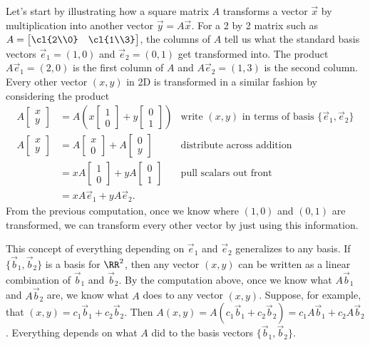 Let's start by illustrating how a square matrix $A$ transforms a
vector $\vec x$ by multiplication into another vector $\vec y=A\vec
x$.  For a 2 by 2 matrix such as $A
= \begin{bmatrix}\cl{2\\0}&\cl{1\\3}\end{bmatrix}$, the columns of $A$
tell us what the standard basis vectors $\vec e_1 = (1,0)$ and $\vec
e_2=(0,1)$ get transformed into.  The
product $A\vec e_1 = (2,0)$ is the first column of $A$ and $A \vec e_2
= (1,3)$ is the second column.  Every other vector $(x,y)$ in 2D is
transformed in a similar fashion by considering the product
\begin{align*}
A\begin{bmatrix}x\\y\end{bmatrix} 
&=A\left(x\begin{bmatrix}1\\0\end{bmatrix}+ 
y\begin{bmatrix}0\\1\end{bmatrix}\right) &\text{write $(x,y)$ in terms of
basis $\{\vec e_1, \vec e_2\}$}\\
A\begin{bmatrix}x\\y\end{bmatrix} 
&=A\begin{bmatrix}x\\0\end{bmatrix}+ 
A\begin{bmatrix}0\\y\end{bmatrix} &\text{distribute across addition}\\
&=xA\begin{bmatrix}1\\0\end{bmatrix}+ 
yA\begin{bmatrix}0\\1\end{bmatrix} &\text{pull scalars out front}\\
&=xA\vec e_1+yA\vec e_2.
\end{align*}
From the previous computation, once we know where $(1,0)$ and $(0,1)$ are transformed, we can transform every other vector by just using this information.

This concept of everything depending on $\vec e_1$ and $\vec e_2$ generalizes to any basis.  If $\{\vec b_1, \vec b_2\}$ is a basis for $\RR^2$, then any vector $(x,y)$ can be written as a linear combination of $\vec b_1$ and $\vec b_2$.  By the computation above, once we know what $A\vec b_1$ and $A\vec b_2$ are, we know what $A$ does to any vector $(x,y)$.  Suppose, for example, that $(x,y)=c_1\vec b_1+c_2\vec b_2$.  Then $A(x,y)=A(c_1\vec b_1+c_2\vec b_2)=c_1A\vec b_1+c_2A\vec b_2$.  Everything depends on what $A$ did to the basis vectors $\{\vec b_1, \vec b_2\}$.


